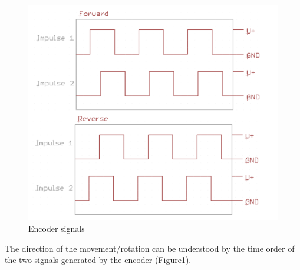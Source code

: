 \begin{figure}[!h]
\begin{center}
\includegraphics[width=0.8\linewidth]{capitolo2/figure/encoder_signals.png}
\caption{Encoder signals}
\label{fig:encoder_signals}
\end{center}
\end{figure}

The direction of the movement/rotation can be understood by the time order of the two signals generated by the encoder (Figure\ref{fig:encoder_signals}).

